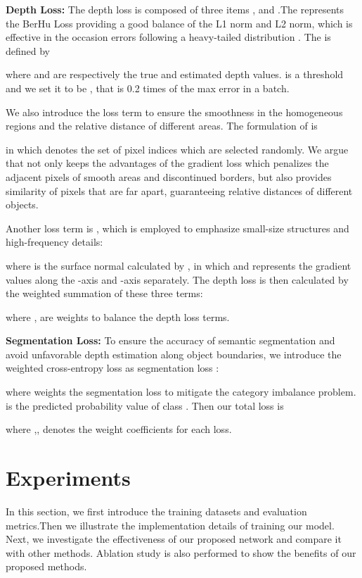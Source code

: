 \documentclass[sn-mathphys]{sn-jnl}
\theoremstyle{thmstyleone}\newtheorem{theorem}{Theorem}\newtheorem{proposition}[theorem]{Proposition}
\theoremstyle{thmstyletwo}\newtheorem{example}{Example}\newtheorem{remark}{Remark}
\theoremstyle{thmstylethree}\newtheorem{definition}{Definition}\usepackage[numbers,sort&compress]{natbib}
\begin{document}
\textbf{Depth Loss:} The depth loss is composed of three items ,  and .The  represents the BerHu Loss providing a good balance of the L1 norm and L2 norm, which is effective in the occasion errors following a heavy-tailed distribution \cite{Laina_2016}. The  is defined by

where  and  are respectively the true and estimated depth values.  is a threshold and we set it to be , that is 0.2 times of the max error in a batch.

We also introduce the loss term  to ensure the smoothness in the homogeneous regions and the relative distance of different areas. The formulation of  is

in which  denotes the set of  pixel indices which are selected randomly. We argue that  not only keeps the advantages of the gradient loss \cite{Chen_2020} which penalizes the adjacent pixels of smooth areas and discontinued borders, but also provides similarity of pixels that are far apart, guaranteeing relative distances of different objects.

Another loss term is , which is employed to emphasize small-size structures and high-frequency details:

where  is the surface normal calculated by 
, in which  and  represents the gradient values along the -axis and -axis separately. The depth loss is then calculated by the weighted summation of these three terms:

where , are weights to balance the depth loss terms.

\textbf{Segmentation Loss:} To ensure the accuracy of semantic segmentation and avoid unfavorable depth estimation along object boundaries, we introduce the weighted cross-entropy loss as segmentation loss :

where  weights the segmentation loss to mitigate the category imbalance problem.  is the predicted probability value of class . Then our total loss is
 
where ,, denotes the weight coefficients for each loss.

\section{Experiments}
In this section, we first introduce the training datasets and evaluation metrics.Then we illustrate the implementation details of training our model. Next, we investigate the effectiveness of our proposed network and compare it with other methods. Ablation study is also performed to show the benefits of our proposed methods.
\end{document}
